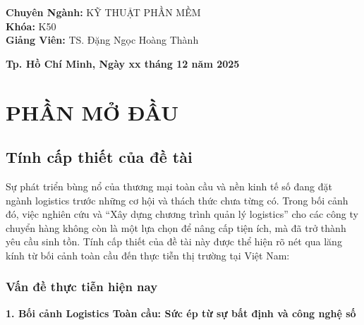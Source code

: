 \documentclass[12pt,a4paper]{article}
\begin{document}
\begin{titlepage}
\begin{flushleft}
\hspace{3.5cm} \textbf{Chuyên Ngành:} \textcolor{uehred}{KỸ THUẬT PHẦN MỀM} \\[0.1cm]
\hspace{3.5cm} \textbf{Khóa:} \textcolor{uehred}{K50} \\[0.8cm]
\hspace{3.5cm} \textbf{Giảng Viên:} TS. Đặng Ngọc Hoàng Thành
\end{flushleft}

\vfill 

{\bfseries \small Tp. Hồ Chí Minh, Ngày xx tháng 12 năm 2025}
\vspace*{0.5cm}

\end{titlepage}

\newpage
\tableofcontents
\thispagestyle{empty} %

\newpage
\pagestyle{plain}
\setcounter{page}{1}
\section{PHẦN MỞ ĐẦU}
\subsection{Tính cấp thiết của đề tài}
Sự phát triển bùng nổ của thương mại toàn cầu và nền kinh tế số đang đặt ngành logistics trước những cơ hội và thách thức chưa từng có. Trong bối cảnh đó, việc nghiên cứu và ``Xây dựng chương trình quản lý logistics'' cho các công ty chuyển hàng không còn là một lựa chọn để nâng cấp tiện ích, mà đã trở thành yêu cầu sinh tồn. Tính cấp thiết của đề tài này được thể hiện rõ nét qua lăng kính từ bối cảnh toàn cầu đến thực tiễn thị trường tại Việt Nam:

\subsubsection{Vấn đề thực tiễn hiện nay}
\vspace{0.5em}
\noindent\textbf{1. Bối cảnh Logistics Toàn cầu: Sức ép từ sự bất định và công nghệ số}
\end{document}
